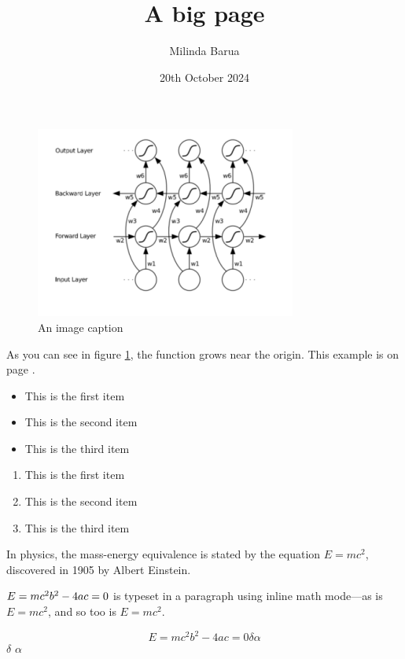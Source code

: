 \documentclass[13pt, letterpaper]{article}
\title{\textbf{A big page}}
\author{Milinda Barua}
\date{20th October 2024}
\begin{document}
\maketitle
\begin{figure}[h]
    \centering
    \includegraphics[width=0.5\linewidth]{./assets/image1.png}
    \caption{An image caption}
    \label{fig:label}
\end{figure}
As you can see in figure \ref{fig:label}, the function grows near the origin. This example is on page \pageref{fig:label}.

\begin{itemize}
    \item This is the first item
    \item This is the second item
    \item This is the third item
\end{itemize}

\begin{enumerate}
    \item This is the first item
    \item This is the second item
    \item This is the third item
\end{enumerate}

In physics, the mass-energy equivalence is stated
by the equation $E=mc^2$, discovered in 1905 by Albert Einstein.

\begin{math}
    \newline
    E=mc^2
    \newline
    b^2 - 4ac = 0
\end{math} is typeset in a paragraph using inline math mode---as is $E=mc^2$, and so too is \(E=mc^2\).

\begin{equation}
    E=mc^2
    b^2 - 4ac = 0
    \delta
    \alpha
\end{equation}
\newline
$\delta$
\newline
$\alpha$
\newline
\end{document}
